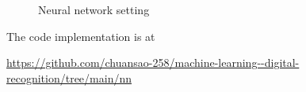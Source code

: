 \documentclass{article}
\begin{document}
	 \begin{figure}[htbp]
	 	\centering
	 	\caption{Neural network setting}
	 \end{figure}
 
 	 The code implementation is at
 	
 	\begin{center}
 		\url{https://github.com/chuansao-258/machine-learning--digital-recognition/tree/main/nn}
 	\end{center} 
	 
\end{document}
